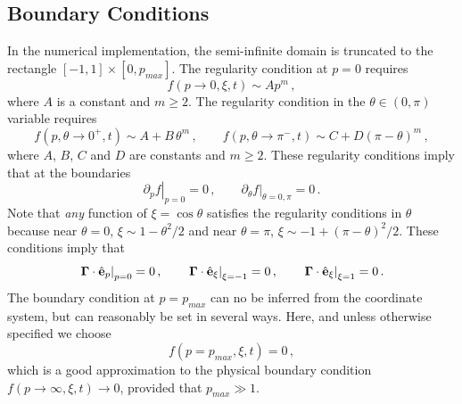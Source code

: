 \documentclass[preprint,11pt]{elsarticle}
\newcommand{\bq}{\begin{equation}}
\newcommand{\eq}{\end{equation}}
\begin{document}
\subsection{Boundary Conditions}
\label{sec:BCs}
In the numerical implementation, the semi-infinite domain is truncated to the rectangle $[-1,1] \times [0, p_{max}]$. The regularity condition at $p=0$ requires
%
\bq
\label{momentumregularity}
f(p\rightarrow 0,\xi,t) \sim A p^m \, ,
\eq 
%
 where $A$ is a constant and  $m \geq 2$. The regularity condition in the $\theta \in (0, \pi)$ variable requires
%
\bq
\label{angregularity}
f (p, \theta \rightarrow  0^+,t) \sim A + B\, \theta^m \, , \qquad
f (p, \theta \rightarrow  \pi^-,t) \sim C + D (\pi-\theta)^m\, ,
\eq
where $A$, $B$, $C$ and $D$ are constants and $m \geq 2$. These regularity conditions imply that at the boundaries
%
\bq
\label{boundaryconditions}
\left. \partial_p f \right|_{p=0}=0 \, , \qquad \partial_\theta f \left. \right |_{\theta=0, \pi}=0 \, .
\eq
%
Note that {\em{any}} function of $\xi = \cos \theta$ satisfies the regularity conditions in $\theta$ because near $\theta=0$, $\xi \sim 1 -\theta^2/2$ and 
near $\theta=\pi$, $\xi \sim -1 +(\pi-\theta)^2/2$.  These conditions imply that
%
\bq
\label{fluxboundaries}
\left. {\bf \Gamma} \cdot \hat {\bf e}_p \right|_{p=0}=0 \, , \qquad 
\left. {\bf \Gamma} \cdot \hat {\bf e}_\xi \right|_{\xi=-1}=0 \, , \qquad 
\left. {\bf \Gamma} \cdot \hat {\bf e}_\xi \right|_{\xi=1}=0 \, .
\eq
%
The boundary condition at $p=p_{max}$ can no be inferred from the coordinate system, but can reasonably be set in several ways. Here, and unless otherwise specified we choose 
%
\bq
\label{pmaxboundary}
f(p=p_{max}, \xi, t)=0 \, ,
\eq
%
which is  a good approximation to the physical boundary condition $f(p\rightarrow \infty , \xi, t) \rightarrow 0$, provided that $p_{max}\gg 1$. 
%
\end{document}
